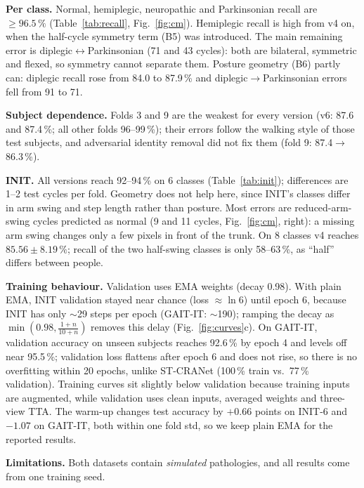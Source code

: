 \documentclass[conference]{IEEEtran}
\begin{document}
\textbf{Per class.} Normal, hemiplegic, neuropathic and Parkinsonian recall are
$\ge96.5\,\%$ (Table~\ref{tab:recall}, Fig.~\ref{fig:cm}). Hemiplegic recall is
high from v4 on, when the half-cycle symmetry term (B5) was introduced. The main
remaining error is diplegic$\leftrightarrow$Parkinsonian (71 and 43 cycles):
both are bilateral, symmetric and flexed, so symmetry cannot separate them.
Posture geometry (B6) partly can: diplegic recall rose from 84.0 to 87.9\,\%
and diplegic$\rightarrow$Parkinsonian errors fell from 91 to 71.

\textbf{Subject dependence.} Folds 3 and 9 are the weakest for every version
(v6: 87.6 and 87.4\,\%; all other folds 96--99\,\%); their errors follow the
walking style of those test subjects, and adversarial identity removal did not
fix them (fold 9: 87.4$\rightarrow$86.3\,\%).

\textbf{INIT.} All versions reach 92--94\,\% on 6 classes
(Table~\ref{tab:init}); differences are 1--2 test cycles per fold. Geometry
does not help here, since INIT's classes differ in arm swing and step length
rather than posture. Most errors are
reduced-arm-swing cycles predicted as normal (9 and 11 cycles,
Fig.~\ref{fig:cm}, right): a missing arm swing changes only a few pixels in front of
the trunk. On 8 classes v4 reaches $85.56\pm8.19\,\%$; recall of the two
half-swing classes is only 58--63\,\%, as ``half'' differs between people.

\textbf{Training behaviour.} Validation uses EMA weights (decay 0.98). With
plain EMA, INIT validation stayed near chance (loss $\approx\ln 6$) until epoch
6, because INIT has only $\sim$29 steps per epoch (GAIT-IT: $\sim$190); ramping
the decay as $\min(0.98,\frac{1+n}{10+n})$ removes this delay
(Fig.~\ref{fig:curves}c). On GAIT-IT, validation accuracy on unseen subjects
reaches 92.6\,\% by epoch 4 and levels off near 95.5\,\%; validation loss
flattens after epoch 6 and does not rise, so there is no overfitting within 20
epochs, unlike ST-CRANet (100\,\% train vs.\ 77\,\% validation). Training
curves sit slightly below validation because training inputs are augmented,
while validation uses clean inputs, averaged weights and three-view TTA. The
warm-up changes test accuracy by $+0.66$ points on INIT-6 and $-1.07$ on
GAIT-IT, both within one fold std, so we keep plain EMA for the reported
results.

\textbf{Limitations.} Both datasets contain \emph{simulated} pathologies, and
all results come from one training seed.

\end{document}
